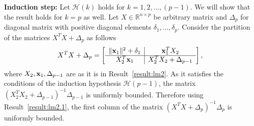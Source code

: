 \documentclass[noinfoline,11pt]{imsart}
\numberwithin{equation}{section}
\theoremstyle{plain}
\newcommand{\lmDelta}{\Delta}
\newcommand{\lmdelta}{\delta}
\newcommand{\lmX}{X}
\newcommand{\R}{\mathbb{R}}
\newcommand{\norm}[1]{ \Vert #1 \Vert }
\newcommand{\lmA}{A}
\newcommand{\lmabf}{{\bf a}}
\newcommand{\lmxbf}{{\bf x}}
\begin{document}
\vspace{.2in}
{\bf Induction step:}
Let $\mathcal{H}(k)$ holds for  $k=1, 2, \ldots , (p-1)$.  We will show that the result holds for $k=p$ as well. Let $\lmX\in \R^{n\times p}$ be arbitrary matrix and  $\lmDelta_{p}$ for diagonal matrix with positive diagonal elements $\lmdelta_1, \ldots , \lmdelta_p$.  Consider the partition of the matrices $\lmX^T\lmX+\lmDelta_p$ as follows 
\begin{eqnarray}\label{eq:lmPartition}
\lmX^T\lmX+\lmDelta_p=\left[
\begin{array}{c|c}
\norm{\lmxbf_{1}}^2+\lmdelta_1 &     \lmxbf_1^T\lmX_2 \\ \hline
  \lmX_2^T\lmxbf_1 &\lmX_2^T\lmX_2+\lmDelta_{p-1}
\end{array}\right],
\end{eqnarray}
where $\lmX_{2}, \lmxbf_1, \lmDelta_{p-1}$ are as it is in Result~\ref{result:lm2}.  As   it  satisfies the conditions of the induction hypothesis $\mathcal{H}{(p-1)}$, the matrix $(\lmX_{2}^T\lmX_{2}+\lmDelta_{p-1})^{-1}\lmDelta_{p-1}$  is uniformly bounded.  Therefore using Result~\ref{result:lm2.1}, the first column of the matrix $(\lmX^T\lmX+\lmDelta_p)^{-1}\lmDelta_p $ is uniformly bounded.

%
\end{document}
